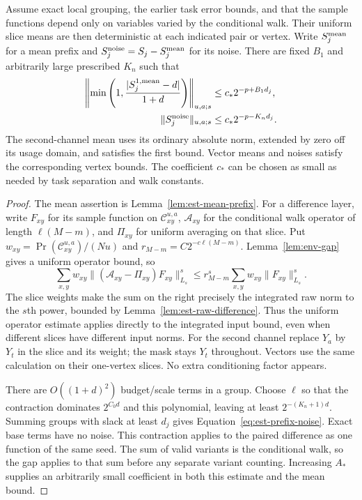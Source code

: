 \begin{lemma}\label{lem:est-prefix}
Assume exact local grouping, the earlier task error bounds, and that the
sample functions depend only on variables varied by the conditional walk.
Their uniform slice means are then deterministic at each indicated pair
or vertex.  Write $S_j^{\rm mean}$ for a mean prefix and
$S_j^{\rm noise}=S_j-S_j^{\rm mean}$ for its noise.  There are fixed
$B_1$ and arbitrarily large prescribed $K_n$ such that
\begin{align}
 \left\|\min\left(1,
       \frac{|S_j^{1,\rm mean}-d|}{1+d}\right)\right\|_{u,a;s}
       &\le c_*2^{-p+B_1d_j},
       \label{eq:est-prefix-mean}\\
 \|S_j^{\rm noise}\|_{u,a;s}
       &\le c_*2^{-p-K_nd_j}.
       \label{eq:est-prefix-noise}
\end{align}
The second-channel mean uses its ordinary absolute norm, extended by zero
off its usage domain, and satisfies the first bound.  Vector means and
noises satisfy the corresponding vertex bounds.  The coefficient $c_*$
can be chosen as small as needed by task separation and walk constants.
\end{lemma}
\begin{proof}
The mean assertion is Lemma~\ref{lem:est-mean-prefix}.
For a difference layer, write $F_{xy}$ for its sample function on
$\mathcal C_{xy}^{u,a}$, $\mathcal A_{xy}$ for the conditional walk
operator of length $\ell(M-m)$, and $\Pi_{xy}$ for uniform averaging
on that slice.  Put
$w_{xy}=\Pr(\mathcal C_{xy}^{u,a})/(Nu)$ and
$r_{M-m}=C2^{-c\ell(M-m)}$.
Lemma~\ref{lem:env-gap} gives a uniform operator bound, so
\[
 \sum_{x,y}w_{xy}
   \|(\mathcal A_{xy}-\Pi_{xy})F_{xy}\|_{L_s}^s
 \le r_{M-m}^s
   \sum_{x,y}w_{xy}\|F_{xy}\|_{L_s}^s.
\]
The slice weights make the sum on the right precisely the integrated raw
norm to the $s$th power, bounded by Lemma~\ref{lem:est-raw-difference}.
Thus the uniform operator estimate applies directly to the integrated
input bound, even when different slices have different input norms.
For the second channel replace $Y_a$ by $Y_t$ in the slice and its
weight; the mask stays $Y_t$ throughout.  Vectors use the same
calculation on their one-vertex slices.  No extra conditioning factor
appears.

There are $O((1+d)^2)$ budget/scale terms in a group.  Choose $\ell$ so
that the contraction dominates $2^{C_0d}$ and this polynomial, leaving
at least $2^{-(K_n+1)d}$.  Summing groups with slack at least $d_j$ gives
Equation~\eqref{eq:est-prefix-noise}.  Exact base terms have no noise.
This contraction applies to the paired difference as one function of the
same seed.  The sum of valid variants is the conditional walk, so the
gap applies to that sum before any separate variant counting.
Increasing $A_*$ supplies an
arbitrarily small coefficient in both this estimate and the mean bound.
\end{proof}

